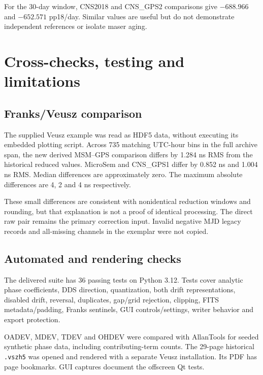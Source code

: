 \documentclass[11pt,a4paper]{article}
\begin{document}
For the 30-day window, CNS2018 and CNS\_GPS2 comparisons give \(-688.966\)
and \(-652.571\) pp18/day. Similar values are useful but do not demonstrate
independent references or isolate maser aging.
\clearpage

\section{Cross-checks, testing and limitations}
\subsection{Franks/Veusz comparison}
The supplied Veusz example was read as HDF5 data, without executing its
embedded plotting script. Across 735 matching UTC-hour bins in the full
archive span, the new derived MSM--GPS comparison differs by 1.284 ns RMS
from the historical reduced values. MicroSem and CNS\_GPS1 differ by
0.852 ns and 1.004 ns RMS. Median differences are approximately zero.
The maximum absolute differences are 4, 2 and 4 ns respectively.

These small differences are consistent with nonidentical reduction windows
and rounding, but that explanation is not a proof of identical processing.
The direct raw pair remains the primary correction input. Invalid negative
MJD legacy records and all-missing channels in the exemplar were not copied.

\subsection{Automated and rendering checks}
The delivered suite has 36 passing tests on Python 3.12. Tests cover analytic
phase coefficients, DDS direction, quantization, both drift representations,
disabled drift, reversal, duplicates, gap/grid rejection, clipping, FITS
metadata/padding, Franks sentinels, GUI controls/settings, writer behavior and
export protection.

OADEV, MDEV, TDEV and OHDEV were compared with AllanTools for seeded synthetic
phase data, including contributing-term counts. The 29-page historical
\texttt{.vszh5} was opened and rendered with a separate Veusz installation.
Its PDF has page bookmarks. GUI captures document the offscreen Qt tests.
\end{document}
